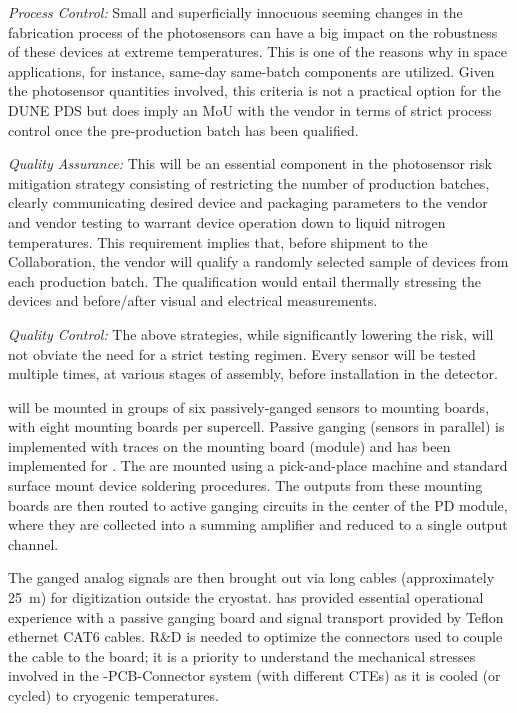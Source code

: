 {\it{Process Control:}} Small and superficially innocuous seeming changes in the fabrication process of the photosensors can have a big impact on the robustness of these devices at extreme temperatures. This is one of the reasons why in space applications, for instance, same-day same-batch components are utilized. Given the photosensor quantities involved, this criteria is not a practical option for the DUNE PDS but does imply an MoU with the vendor in terms of strict process control once the pre-production batch has been qualified.

{\it{Quality Assurance:}} This will be an essential component in the photosensor risk mitigation strategy consisting of restricting the number of production batches, clearly communicating desired device and packaging parameters to the vendor and vendor testing to warrant device operation down to liquid nitrogen temperatures. This requirement implies that, before shipment to the Collaboration, the vendor will qualify a randomly selected sample of devices from each production batch. The qualification would entail thermally stressing the devices and before/after visual and electrical measurements. 

{\it{Quality Control:}} The above strategies, while significantly lowering the risk, will not obviate the need for a strict testing regimen. Every sensor will be tested multiple times, at various stages of assembly, before installation in the detector.

 will be mounted in groups of six passively-ganged sensors to mounting boards, with eight mounting boards per supercell.  Passive ganging (sensors in parallel) is implemented with traces on the  mounting board (module) and has been implemented for .  The  are mounted using a pick-and-place machine and standard surface mount device soldering procedures. The outputs from these mounting boards are then routed to active ganging circuits in the center of the PD module, where they are collected into a summing amplifier and reduced to a single output channel.


The ganged analog signals are then brought out via long cables (approximately \SI{25}{m}) for digitization outside the cryostat.
 has provided essential operational experience with a passive ganging board and signal transport provided by Teflon ethernet CAT6 cables.
R\&D is needed to optimize the connectors used to couple the cable to the board;  it is a priority to understand the mechanical stresses involved in the -PCB-Connector system (with different CTEs) as it is cooled (or cycled) to cryogenic temperatures.


